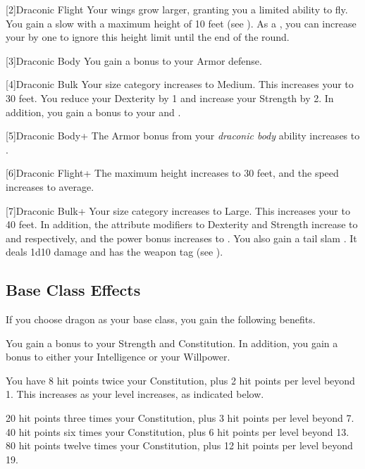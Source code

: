     [2]{Draconic Flight} Your wings grow larger, granting you a limited ability to fly.
      You gain a slow  with a maximum height of 10 feet (see ).
      As a , you can increase your  by one to ignore this height limit until the end of the round.

    [3]{Draconic Body} You gain a  bonus to your Armor defense.

    [4]{Draconic Bulk} Your size category increases to Medium.
      This increases your  to 30 feet.
      You reduce your Dexterity by 1 and increase your Strength by 2.
      In addition, you gain a  bonus to your  and .

    [5]{Draconic Body+} The Armor bonus from your \textit{draconic body} ability increases to .

    [6]{Draconic Flight+} The maximum height increases to 30 feet, and the speed increases to average.

    [7]{Draconic Bulk+} Your size category increases to Large.
      This increases your  to 40 feet.
      In addition, the attribute modifiers to Dexterity and Strength increase to  and  respectively, and the power bonus increases to .
      You also gain a tail slam .
      It deals 1d10 damage and has the  weapon tag (see ).

  \subsection{Base Class Effects}
    If you choose dragon as your base class, you gain the following benefits.

     You gain a  bonus to your Strength and Constitution. In addition, you gain a  bonus to either your Intelligence or your Willpower.

      You have 8 hit points \add twice your Constitution, plus 2 hit points per level beyond 1.
      This increases as your level increases, as indicated below.
      \begin{itemize}
         20 hit points \add three times your Constitution, plus 3 hit points per level beyond 7.
         40 hit points \add six times your Constitution, plus 6 hit points per level beyond 13.
         80 hit points \add twelve times your Constitution, plus 12 hit points per level beyond 19.
      \end{itemize}

